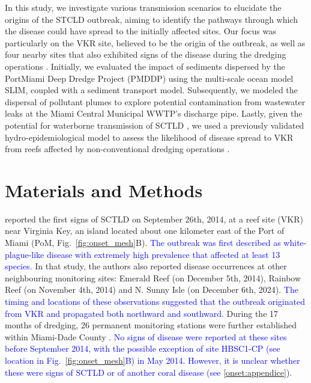\documentclass[preprint,12pt,authoryear]{elsarticle}
\newcommand{\modif}[1]{\textcolor{blue}{#1}}
\begin{document}
In this study, we investigate various transmission scenarios to elucidate the origins of the STCLD outbreak, aiming to identify the pathways through which the disease could have spread to the initially affected sites. Our focus was particularly on the VKR site, believed to be the origin of the outbreak, as well as four nearby sites that also exhibited signs of the disease during the dredging operations \citep{precht2016unprecedented}. Initially, we evaluated the impact of sediments dispersed by the PortMiami Deep Dredge Project (PMDDP) using the multi-scale ocean model SLIM, coupled with a sediment transport model. Subsequently, we modeled the dispersal of pollutant plumes to explore potential contamination from wastewater leaks at the Miami Central Municipal WWTP’s discharge pipe. Lastly, given the potential for waterborne transmission of SCTLD \citep{aeby2019pathogenesis,eaton2021measuring, meiling2021variable}, we used a previously validated hydro-epidemiological model to assess the likelihood of disease spread to VKR from reefs affected by non-conventional dredging operations \citep{dobbelaere2022connecting}.

\section{Materials and Methods}

\cite{precht2016unprecedented} reported the first signs of SCTLD on September 26th, 2014, at a reef site (VKR) near Virginia Key, an island located about one kilometer east of the Port of Miami (PoM, Fig.~\ref{fig:onset_mesh}B). \modif{The outbreak was first described as white-plague-like disease with extremely high prevalence that affected at least 13 species.} In that study, the authors also reported disease occurrences at other neighbouring monitoring sites: Emerald Reef (on December 5th, 2014), Rainbow Reef (on November 4th, 2014) and N. Sunny Isle (on December 6th, 2024). \modif{The timing and locations of these observations suggested that the outbreak originated from VKR and propagated both northward and southward.} %
During the 17 months of dredging, 26 permanent monitoring stations were further established within Miami-Dade County \citep{gintert2019regional}. \modif{No signs of disease were reported at these sites before September 2014, with the possible exception of site HBSC1-CP (see location in Fig.~\ref{fig:onset_mesh}B) in May 2014. However, it is unclear whether these were signs of SCTLD or of another coral disease (see \ref{onset:appendice})}.
\end{document}
